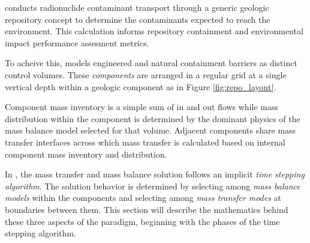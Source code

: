 \Cyder conducts radionuclide contaminant transport through a generic geologic 
repository concept to determine the contaminants expected to reach the 
environment. This calculation informs repository containment and environmental 
impact performance assesment metrics.

To acheive this, \Cyder models engineered and natural containment barriers as
distinct control volumes. These \emph{components} are arranged in a regular
grid at a single vertical depth within a geologic component as in Figure
\ref{fig:repo_layout}.



Component mass inventory is a simple sum of in and out flows while mass
distribution within the component is determined by the dominant physics of the
mass balance model selected for that volume.  Adjacent components share mass
transfer interfaces across which mass transfer is calculated based on internal
component mass inventory and distribution.

In \Cyder, the mass transfer and mass balance solution follows an implicit
\emph{time stepping algorithm}. The solution behavior is determined by selecting
among \emph{mass balance models} within the components and selecting
among \emph{mass transfer modes} at boundaries between them. This section will describe
the mathematics behind these three aspects of the \Cyder paradigm, beginning
with the phases of the time stepping algorithm.
